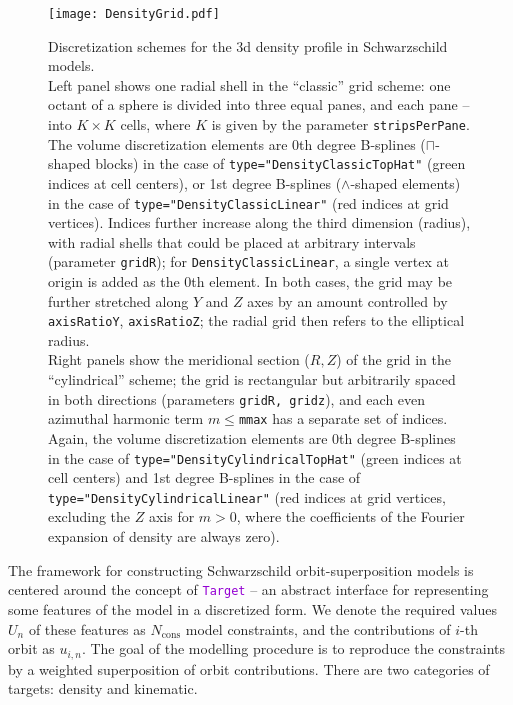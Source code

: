 \documentclass[12pt]{article}
\newcommand{\ttt}[1]{\textcolor{darkviolet}{\texttt{#1}}}
\newcommand{\ppp}[1]{\textcolor{darkolive} {\texttt{#1}}}
\begin{document}
\begin{figure}
\texttt{[image: DensityGrid.pdf]}
\caption{Discretization schemes for the 3d density profile in Schwarzschild models.\protect\\
Left panel shows one radial shell in the ``classic'' grid scheme: one octant of a sphere is divided into three equal panes, and each pane -- into $K\times K$ cells, where $K$ is given by the parameter \ppp{stripsPerPane}. The volume discretization elements are 0th degree B-splines ($\sqcap$-shaped blocks) in the case of \ppp{type="DensityClassicTopHat"} (green indices at cell centers), or 1st degree B-splines ($\wedge$-shaped elements) in the case of \ppp{type="DensityClassicLinear"} (red indices at grid vertices). Indices further increase along the third dimension (radius), with radial shells that could be placed at arbitrary intervals (parameter \ppp{gridR}); for \ppp{DensityClassicLinear}, a single vertex at origin is added as the 0th element. In both cases, the grid may be further stretched along $Y$ and $Z$ axes by an amount controlled by \ppp{axisRatioY}, \ppp{axisRatioZ}; the radial grid then refers to the elliptical radius.\protect\\
Right panels show the meridional section ($R,Z$) of the grid in the ``cylindrical'' scheme; the grid is rectangular but arbitrarily spaced in both directions (parameters \ppp{gridR, gridz}), and each even azimuthal harmonic term $m \le {}$\ppp{mmax} has a separate set of indices. Again, the volume discretization elements are 0th degree B-splines in the case of \ppp{type="DensityCylindricalTopHat"} (green indices at cell centers) and 1st degree B-splines in the case of \ppp{type="DensityCylindricalLinear"} (red indices at grid vertices, excluding the $Z$ axis for $m>0$, where the coefficients of the Fourier expansion of density are always zero).
}  \label{fig:DensityGrid}
\end{figure}

The framework for constructing Schwarzschild orbit-superposition models is centered around the concept of \ttt{Target} -- an abstract interface for representing some features of the model in a discretized form. We denote the required values $U_n$ of these features as $N_\mathrm{cons}$ model constraints, and the contributions of $i$-th orbit as $u_{i,n}$. The goal of the modelling procedure is to reproduce the constraints by a weighted superposition of orbit contributions.
There are two categories of targets: density and kinematic.
\end{document}
